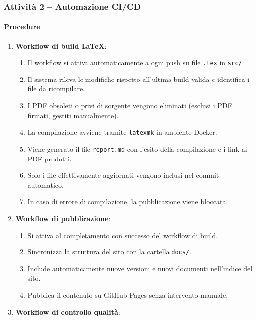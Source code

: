 \documentclass[a4paper, 11pt, oneside]{scrartcl}
\begin{document}
\subsubsection{Attività 2 – Automazione CI/CD}

\paragraph{Procedure}
\begin{enumerate}
    \item \textbf{Workflow di build \LaTeX{}}:
    \begin{enumerate}[label=\alph*.]
        \item Il workflow si attiva automaticamente a ogni push su file \texttt{.tex} in \texttt{src/}.
        \item Il sistema rileva le modifiche rispetto all'ultima build valida e identifica i file da ricompilare.
        \item I PDF obsoleti o privi di sorgente vengono eliminati (esclusi i PDF firmati, gestiti manualmente).
        \item La compilazione avviene tramite \texttt{latexmk} in ambiente Docker{\scriptsize{}}.
        \item Viene generato il file \texttt{report.md} con l'esito della compilazione e i link ai PDF prodotti.
        \item Solo i file effettivamente aggiornati vengono inclusi nel commit automatico.
        \item In caso di errore di compilazione, la pubblicazione viene bloccata.
    \end{enumerate}
    \item \textbf{Workflow di pubblicazione}:
    \begin{enumerate}[label=\alph*.]
        \item Si attiva al completamento con successo del workflow di build.
        \item Sincronizza la struttura del sito con la cartella \texttt{docs/}.
        \item Include automaticamente nuove versioni e nuovi documenti nell'indice del sito.
        \item Pubblica il contenuto su GitHub Pages senza intervento manuale.
    \end{enumerate}
    \item \textbf{Workflow di controllo qualità}:
    \begin{enumerate}[label=\alph*.]

\end{enumerate}
\end{enumerate}
\end{document}
